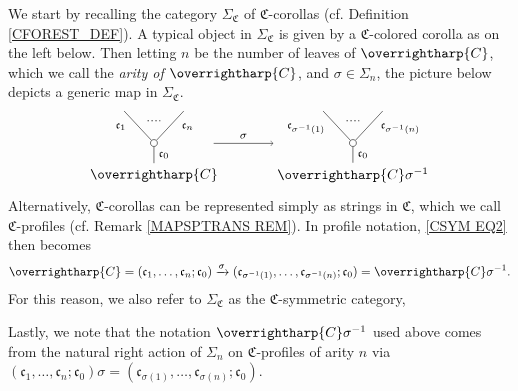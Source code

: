 \documentclass[a4paper,10pt
,draft
]{article}%
\numberwithin{equation}{section}
\numberwithin{figure}{section}
\theoremstyle{definition} %
\newcommand{\vect}[1]{\text{\overrightharp{\ensuremath{#1}}}}
\newcommand{\1}{\ensuremath{\mathbbm 1}}%
\begin{document}
We start by recalling the category 
$\Sigma_{\mathfrak{C}}$
of $\mathfrak{C}$-corollas (cf. Definition \ref{CFOREST_DEF}).
A typical object in $\Sigma_{\mathfrak{C}}$
is given by a 
$\mathfrak{C}$-colored corolla as on the left below.
Then letting $n$ be the number of leaves of $\vect{C}$,
which we call the \emph{arity of $\vect{C}$},
and $\sigma \in \Sigma_n$,
the picture below depicts a 
generic map in $\Sigma_{\mathfrak{C}}$.
\begin{equation}\label{CSYM EQ2}
\begin{tikzpicture}
[grow=up,auto,level distance=2.3em,every node/.style = {font=\footnotesize},dummy/.style={circle,draw,inner sep=0pt,minimum size=1.75mm}]

\node at (0,0) [font=\normalsize]{$\vect{C}$}
child{node [dummy] {}
	child{
		edge from parent node [swap,near end] {$\mathfrak c_n$} node [name=Kn] {}}
	child{
		edge from parent node [near end] {$\mathfrak c_1$}
		node [name=Kone,swap] {}}
	edge from parent node [swap] {$\mathfrak c_0$}
};
\draw [dotted,thick] (Kone) -- (Kn) ;
\node at (5,0) [font=\normalsize] {$\vect{C} \sigma^{-1}
	$}
child{node [dummy] {}
	child{
		edge from parent node [swap,near end] {$\mathfrak c_{\sigma^{-1}(n)}$} node [name=Kn] {}}
	child{
		edge from parent node [near end] {$\mathfrak c_{\sigma^{-1}(1)}$}
		node [name=Kone,swap] {}}
	edge from parent node [swap] {$\mathfrak c_0$}
};
\draw [dotted,thick] (Kone) -- (Kn) ;

\draw[->] (1.5,0.8) -- node{$\sigma$} (3,0.8);
\end{tikzpicture}
\end{equation}
Alternatively,
$\mathfrak{C}$-corollas can be represented simply as
strings in $\mathfrak{C}$,
which we call $\mathfrak{C}$-profiles
(cf. Remark \ref{MAPSPTRANS REM}).
In profile notation, 
\eqref{CSYM EQ2} then becomes
\begin{equation}\label{CSYM EQ1}
\vect{C} =
(\mathfrak c_1, \dots, \mathfrak c_n; \mathfrak c_0) \xrightarrow{\sigma} (\mathfrak c_{\sigma^{-1}(1)}, \dots, \mathfrak c_{\sigma^{-1}(n)}; \mathfrak c_0)
= \vect{C} \sigma^{-1}.
\end{equation}
For this reason, we also refer to 
$\Sigma_{\mathfrak{C}}$ as the 
$\mathfrak{C}$-symmetric category,

Lastly, we note that the notation
$\vect{C} \sigma^{-1}$ used above
comes from the natural right action of $\Sigma_n$
on $\mathfrak{C}$-profiles of arity $n$ via
$
(\mathfrak c_1, \dots, \mathfrak c_n; \mathfrak c_0) \sigma
=
(\mathfrak c_{\sigma(1)}, \dots, \mathfrak c_{\sigma(n)}; \mathfrak c_0)$.
\end{document}
